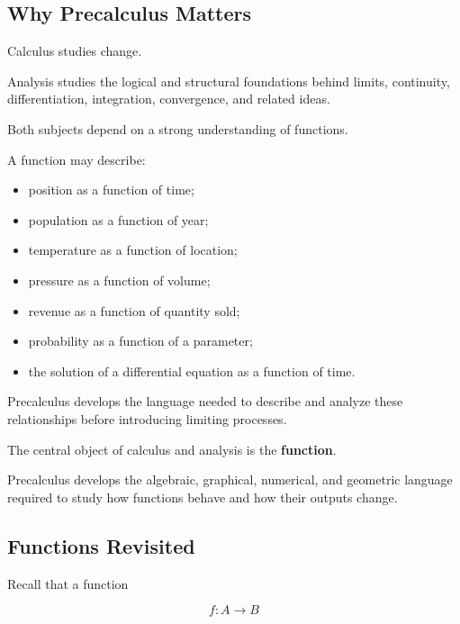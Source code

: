 \subsection{Why Precalculus Matters}
\label{subsec:why-precalculus}

Calculus studies change.

Analysis studies the logical and structural foundations behind limits,
continuity, differentiation, integration, convergence, and related ideas.

Both subjects depend on a strong understanding of functions.

A function may describe:

\begin{itemize}
    \item position as a function of time;
    \item population as a function of year;
    \item temperature as a function of location;
    \item pressure as a function of volume;
    \item revenue as a function of quantity sold;
    \item probability as a function of a parameter;
    \item the solution of a differential equation as a function of time.
\end{itemize}

Precalculus develops the language needed to describe and analyze these
relationships before introducing limiting processes.

\begin{conceptbox}
The central object of calculus and analysis is the \textbf{function}.

Precalculus develops the algebraic, graphical, numerical, and geometric
language required to study how functions behave and how their outputs change.
\end{conceptbox}

\subsection{Functions Revisited}
\label{subsec:analysis-functions-revisited}

Recall that a function

\[ f:A\to B \]

